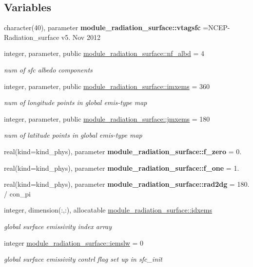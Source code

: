 \subsection*{Variables}
\begin{DoxyCompactItemize}
\item 
\mbox{\label{radiation__surface_8f_ab0b8c10a0fb6be2644fdf91e3fe1fc5c}} 
character(40), parameter {\bfseries module\+\_\+radiation\+\_\+surface\+::vtagsfc} =\textquotesingle{}N\+C\+EP-\/Radiation\+\_\+surface v5. Nov 2012 \textquotesingle{}
\item 
integer, parameter, public \hyperlink{group__module__radiation__surface_gab7800982c900bd632ca74d5e7d2b5ab3}{module\+\_\+radiation\+\_\+surface\+::nf\+\_\+albd} = 4
\begin{DoxyCompactList}\small\item\em num of sfc albedo components \end{DoxyCompactList}\item 
integer, parameter, public \hyperlink{group__module__radiation__surface_gaab4b9853c71ff40f8db2aa78b7cab265}{module\+\_\+radiation\+\_\+surface\+::imxems} = 360
\begin{DoxyCompactList}\small\item\em num of longitude points in global emis-\/type map \end{DoxyCompactList}\item 
integer, parameter, public \hyperlink{group__module__radiation__surface_ga3922674f1c727d517ba5b0f7f5093970}{module\+\_\+radiation\+\_\+surface\+::jmxems} = 180
\begin{DoxyCompactList}\small\item\em num of latitude points in global emis-\/type map \end{DoxyCompactList}\item 
real(kind=kind\+\_\+phys), parameter {\bfseries module\+\_\+radiation\+\_\+surface\+::f\+\_\+zero} = 0.
\item 
real(kind=kind\+\_\+phys), parameter {\bfseries module\+\_\+radiation\+\_\+surface\+::f\+\_\+one} = 1.
\item 
real(kind=kind\+\_\+phys), parameter {\bfseries module\+\_\+radiation\+\_\+surface\+::rad2dg} = 180. / con\+\_\+pi
\item 
integer, dimension(\+:,\+:), allocatable \hyperlink{group__module__radiation__surface_gac33f1f3441f8336d7eb7e15cba26caf7}{module\+\_\+radiation\+\_\+surface\+::idxems}
\begin{DoxyCompactList}\small\item\em global surface emissivity index array \end{DoxyCompactList}\item 
integer \hyperlink{group__module__radiation__surface_ga3ceebb99dbffcb70a14cfcaa7b029abc}{module\+\_\+radiation\+\_\+surface\+::iemslw} = 0
\begin{DoxyCompactList}\small\item\em global surface emissivity contrl flag set up in \textquotesingle{}sfc\+\_\+init\textquotesingle{} \end{DoxyCompactList}\end{DoxyCompactItemize}
